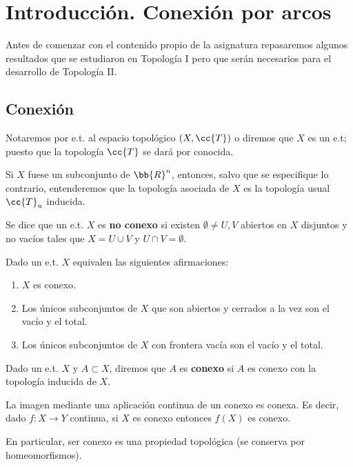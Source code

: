\chapter*{Introducción. Conexión por arcos}

Antes de comenzar con el contenido propio de la asignatura repasaremos algunos resultados que se estudiaron en Topología I pero que serán necesarios para el desarrollo de Topología II.

\section{Conexión}

\begin{notacion}
    Notaremos por e.t. al espacio topológico $(X,\cc{T})$ o diremos que $X$ es un e.t; puesto que la topología $\cc{T}$ se dará por conocida.

    Si $X$ fuese un subconjunto de $\bb{R}^n$, entonces, salvo que se especifique lo contrario, entenderemos que la topología asociada de $X$ es la topología usual $\cc{T}_u$ inducida.
\end{notacion}

\begin{definicion}
    Se dice que un e.t. $X$ es \textbf{no conexo} si existen $\emptyset \neq U, V$ abiertos en $X$ disjuntos y no vacíos tales que $X=U\cup V$ y $U\cap V = \emptyset$. 
\end{definicion}

\begin{prop}
    Dado un e.t. $X$ equivalen las siguientes afirmaciones:
    \begin{enumerate}
        \item $X$ es conexo.
        \item Los únicos subconjuntos de $X$ que son abiertos y cerrados a la vez son el vacío y el total. 
        \item Los únicos subconjuntos de $X$ con frontera vacía son el vacío y el total. 
    \end{enumerate}
\end{prop}

\begin{definicion}
    Dado un e.t. $X$ y $A\subset X$, diremos que $A$ es \textbf{conexo} si $A$ es conexo con la topología inducida de $X$.
\end{definicion}

\begin{teo}
    La imagen mediante una aplicación continua de un conexo es conexa. Es decir, dado $f:X\to Y$ continua, si $X$ es conexo entonces $f(X)$ es conexo.
    
    En particular, ser conexo es una propiedad topológica (se conserva por homeomorfismos).
\end{teo}

